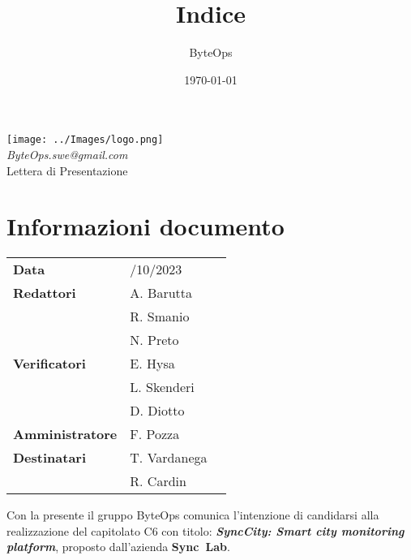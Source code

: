 \documentclass{article}
\title{\textbf{\fontsize{30}{6}\selectfont Indice}}
\author{\fontsize{14}{6}\selectfont ByteOps}
\date{\today}
\begin{document}
\pagestyle{fancy}
\begin{center}
\texttt{[image: ../Images/logo.png]} \\
\vspace{0.2cm}
\textcolor[RGB]{60, 60, 60}{\textit{ByteOps.swe@gmail.com}} \\
\vspace{1cm}
\fontsize{16}{6}\selectfont Lettera di Presentazione\\
\vspace{0.5cm}
\end{center}

\section*{Informazioni documento}
\def\arraystretch{1.2}
\begin{tabular}{>{\raggedleft\arraybackslash}p{}|>{\raggedright\arraybackslash}p{}c}
\hline
\addlinespace

    \textbf{Data} & 24/10/2023 \vspace{10pt} \\
    \textbf{Redattori} & A. Barutta \\ & R. Smanio \\ & N. Preto \vspace{10pt} \\
    \textbf{Verificatori} & E. Hysa \\ & L. Skenderi \\ & D. Diotto \vspace{10pt} \\
    \textbf{Amministratore} & F. Pozza \vspace{10pt} \\
    \textbf{Destinatari} & T. Vardanega \\ & R. Cardin \vspace{10pt} \\
\end{tabular}
\pagebreak 

\flushleft

Con la presente il gruppo ByteOps comunica l’intenzione di candidarsi alla realizzazione del capitolato C6 con titolo: \textbf{\textit{SyncCity: Smart city monitoring platform}}, proposto dall'azienda \mbox{\textbf{Sync Lab}}. 
\vspace{0.5cm}
\end{document}
